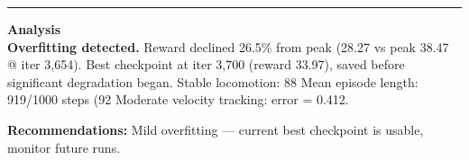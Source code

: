 \documentclass[a4paper,10pt]{article}
\begin{document}
\vspace{2pt}
\hrule
\vspace{2pt}

\footnotesize
\textbf{Analysis} \\[1pt]
\textbf{Overfitting detected.} Reward declined 26.5\% from peak (28.27 vs peak 38.47 @ iter 3,654).
Best checkpoint at iter 3,700 (reward 33.97), saved before significant degradation began.
Stable locomotion: 88%
Mean episode length: 919/1000 steps (92%
Moderate velocity tracking: error = 0.412.

\textbf{Recommendations:}
Mild overfitting --- current best checkpoint is usable, monitor future runs.
\end{document}
